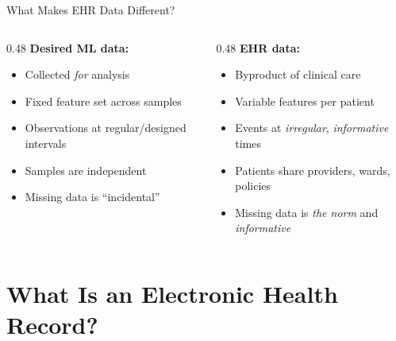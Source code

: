 \documentclass[aspectratio=169,10pt]{beamer}
\begin{document}
\begin{frame}{What Makes EHR Data Different?}
\begin{columns}[T]
\begin{column}{0.48\textwidth}
\textbf{Desired ML data:}
\begin{itemize}
    \item Collected \emph{for} analysis
    \item Fixed feature set across samples
    \item Observations at regular/designed intervals
    \item Samples are independent
    \item Missing data is ``incidental''
\end{itemize}
\end{column}
\begin{column}{0.48\textwidth}
\textbf{EHR data:}
\begin{itemize}
    \item<2-> \alert{Byproduct} of clinical care
    \item<3-> Variable features per patient
    \item<4-> Events at \emph{irregular}, \emph{informative} times
    \item<5-> Patients share providers, wards, policies
    \item<6-> Missing data is \emph{the norm} and \emph{informative}
\end{itemize}
\end{column}
\end{columns}


\vspace{0.5em}
\end{frame}





\section{What Is an Electronic Health Record?}
\end{document}
